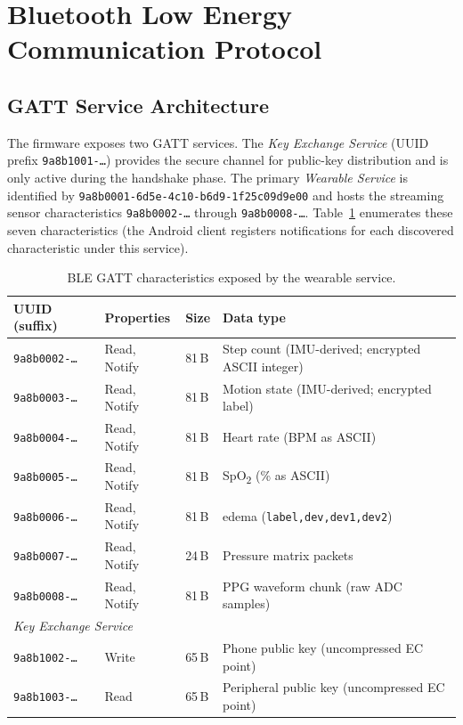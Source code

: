 \section{Bluetooth Low Energy Communication Protocol}
\label{sec:ble}


\subsection{GATT Service Architecture}
\label{subsec:ble_gatt}

The firmware exposes two GATT services.  The \textit{Key Exchange Service} (UUID prefix
\texttt{9a8b1001-\ldots}) provides the secure channel for public-key distribution and is only
active during the handshake phase.  The primary \textit{Wearable Service} is identified by
\texttt{9a8b0001-6d5e-4c10-b6d9-1f25c09d9e00} and hosts the streaming sensor characteristics
\texttt{9a8b0002-\ldots} through \texttt{9a8b0008-\ldots}.
Table~\ref{tab:ble_chars} enumerates these seven characteristics (the Android client registers
notifications for each discovered characteristic under this service).

\begin{table}[htbp]
  \centering
  \caption{BLE GATT characteristics exposed by the wearable service.}
  \label{tab:ble_chars}
  \begin{tabularx}{\textwidth}{l l l X}
    \hline
    \textbf{UUID (suffix)} & \textbf{Properties} & \textbf{Size} & \textbf{Data type} \\
    \hline
    \texttt{9a8b0002-\ldots} & Read, Notify & 81\,B & Step count (IMU-derived; encrypted ASCII integer) \\
    \texttt{9a8b0003-\ldots} & Read, Notify & 81\,B & Motion state (IMU-derived; encrypted label) \\
    \texttt{9a8b0004-\ldots} & Read, Notify & 81\,B & Heart rate (BPM as ASCII) \\
    \texttt{9a8b0005-\ldots} & Read, Notify & 81\,B & SpO\textsubscript{2} (\% as ASCII) \\
    \texttt{9a8b0006-\ldots} & Read, Notify & 81\,B & edema (\texttt{label,dev,dev1,dev2}) \\
    \texttt{9a8b0007-\ldots} & Read, Notify & 24\,B & Pressure matrix packets \\
    \texttt{9a8b0008-\ldots} & Read, Notify & 81\,B & PPG waveform chunk (raw ADC samples) \\
    \hline
    \multicolumn{4}{l}{\textit{Key Exchange Service}} \\
    \hline
    \texttt{9a8b1002-\ldots} & Write        & 65\,B & Phone public key (uncompressed EC point) \\
    \texttt{9a8b1003-\ldots} & Read         & 65\,B & Peripheral public key (uncompressed EC point) \\
    \hline
  \end{tabularx}
\end{table}

